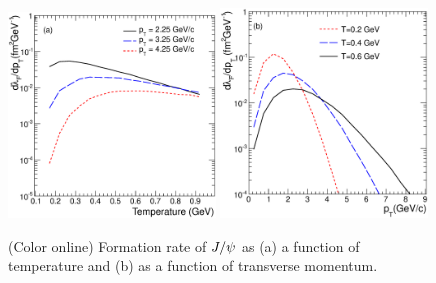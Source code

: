 \documentclass[aps,prc,preprint,superscriptaddress,showpacs,showkeys]{revtex4-1}
\begin{document}
\begin{figure}
\includegraphics[width=0.49\textwidth]{Figures/Fig4a_FRateVsT.eps}
\includegraphics[width=0.49\textwidth]{Figures/Fig4b_FRateVsPt.eps}
\caption{(Color online) Formation rate of  $J/\psi$ as (a) a function of  temperature and (b) as a 
function of transverse momentum.}
\label{fig:ForRateVsTempAndPt}
\end{figure}

\end{document}
